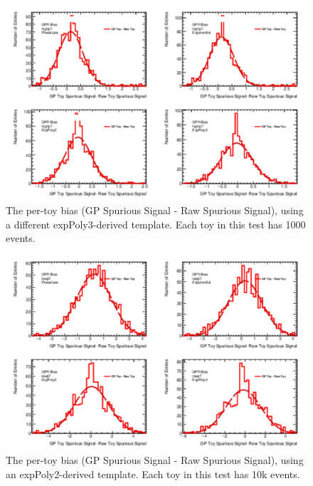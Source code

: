 \begin{figure} 
\begin{center}
  \includegraphics[width=\textwidth]{figures/background/gpr/validation/nominal/ToyTest_FitSigBiases_highpT_1000_noSig}   
\caption{The per-toy bias (GP Spurious Signal - Raw Spurious Signal), using a different expPoly3-derived template. Each toy in this test has 1000 events.}
\label{fig:bias_highpt_1000_noSig}
\end{center}
\end{figure}

\begin{figure} 
\begin{center}
  \includegraphics[width=\textwidth]{figures/background/gpr/validation/nominal/ToyTest_FitSigBiases_lowpT_10k_noSig}   
\caption{The per-toy bias (GP Spurious Signal - Raw Spurious Signal), using an expPoly2-derived template. Each toy in this test has 10k events.}
\label{fig:bias_lowpt_10k_noSig}
\end{center}
\end{figure}

